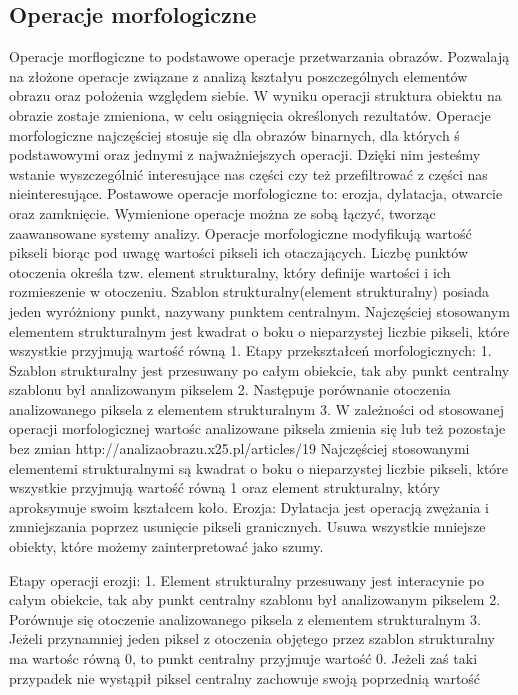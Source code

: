 \documentclass[a4paper,12pt,twoside,openany]{report}
\begin{document}
\subsection{Operacje morfologiczne}
Operacje morflogiczne to podstawowe operacje przetwarzania obrazów. Pozwalają na złożone operacje związane z analizą kształyu poszczególnych elementów obrazu oraz położenia względem siebie. W wyniku operacji struktura obiektu na obrazie zostaje zmieniona, w celu osiągnięcia określonych rezultatów. 
Operacje morfologiczne najczęściej stosuje się dla obrazów binarnych, dla których ś podstawowymi oraz jednymi z najważniejszych operacji. Dzięki nim jesteśmy wstanie wyszczególnić interesujące nas części czy też przefiltrować z części nas nieinteresujące. Postawowe operacje morfologiczne to: erozja, dylatacja, otwarcie oraz zamknięcie. Wymienione operacje można ze sobą łączyć, tworząc zaawansowane systemy analizy.
Operacje morfologiczne modyfikują wartość pikseli biorąc pod uwagę wartości pikseli ich otaczających. Liczbę punktów otoczenia określa tzw. element strukturalny, który definije wartości i ich rozmieszenie w otoczeniu. Szablon strukturalny(element strukturalny) posiada jeden wyróżniony punkt, nazywany punktem centralnym.
Najczęściej stosowanym elementem strukturalnym jest kwadrat o boku o nieparzystej liczbie pikseli, które wszystkie przyjmują wartość równą 1.
Etapy przekształceń morfologicznych:
1. Szablon strukturalny jest przesuwany po całym obiekcie, tak aby punkt centralny szablonu był analizowanym pikselem
2. Następuje porównanie otoczenia analizowanego piksela z elementem strukturalnym
3. W zależności od stosowanej operacji morfologicznej wartośc analizowane piksela zmienia się lub też pozostaje bez zmian
http://analizaobrazu.x25.pl/articles/19
Najczęściej stosowanymi elementemi strukturalnymi są kwadrat o boku o nieparzystej liczbie pikseli, które wszystkie przyjmują wartość równą 1 oraz element strukturalny, który aproksymuje swoim kształcem koło.
Erozja:
Dylatacja jest operacją zwężania i zmniejszania poprzez usunięcie pikseli granicznych. Usuwa wszystkie mniejsze obiekty, które możemy zainterpretować jako szumy. 

Etapy operacji erozji:
1. Element strukturalny przesuwany jest interacynie po całym obiekcie,  tak aby punkt centralny szablonu był analizowanym pikselem
2. Porównuje się otoczenie analizowanego piksela z elementem strukturalnym
3. Jeżeli przynamniej jeden piksel z otoczenia objętego przez szablon strukturalny ma wartośc równą 0, to punkt centralny przyjmuje wartość 0. Jeżeli zaś taki przypadek nie wystąpił piksel centralny zachowuje swoją poprzednią wartość
\end{document}
